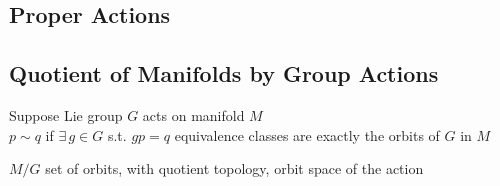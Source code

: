 \subsection*{Proper Actions}

\subsection*{Quotient of Manifolds by Group Actions}

Suppose Lie group $G$ acts on manifold $M$ \\
$p\sim q$ if $\exists \, g \in G$ s.t. $gp = q$ \quad equivalence classes are exactly the orbits of $G$ in $M$  

$M/G$ set of orbits, with quotient topology, orbit space of the action
